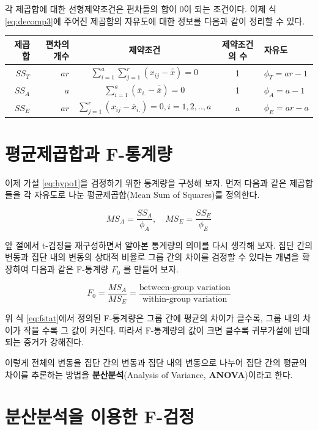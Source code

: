 \documentclass[
]{book}
\begin{document}
각 제곱합에 대한 선형제약조건은 편차들의 합이 0이 되는 조건이다. 이제 식 \eqref{eq:decomp3}에 주어진 제곱합의 자유도에 대한 정보를 다음과 같이 정리할 수 있다.

\begin{longtable}[]{@{}rrccl@{}}
\toprule
제곱합 & 편차의 개수 & 제약조건 & 제약조건의 수 & 자유도\tabularnewline
\midrule
\endhead
\(SS_T\) & \(ar\) & \(\sum_{i=1}^a \sum_{j=1}^r (x_{ij} - \bar{\bar {x}})=0\) & 1 & \(\phi_T= ar-1\)\tabularnewline
\(SS_A\) & \(a\) & \(\sum_{i=1}^a (\bar {x}_{i.} - \bar{\bar {x}} ) =0\) & 1 & \(\phi_A=a-1\)\tabularnewline
\(SS_E\) & \(ar\) & \(\sum_{j=1}^r ( x_{ij} - \bar {x}_{i.} ) =0, i=1,2,..,a\) & a & \(\phi_E=ar-a\)\tabularnewline
\bottomrule
\end{longtable}

\hypertarget{uxd3c9uxade0uxc81cuxacf1uxd569uxacfc-f-uxd1b5uxacc4uxb7c9}{%
\section{평균제곱합과 F-통계량}\label{uxd3c9uxade0uxc81cuxacf1uxd569uxacfc-f-uxd1b5uxacc4uxb7c9}}

이제 가설 \eqref{eq:hypo1}을 검정하기 위한 통계량을 구성해 보자. 먼저 다음과 같은 제곱합들을 각 자유도로 나눈 평균제곱합(Mean Sum of Squares)를 정의한다.

\begin{equation}
MS_A = \frac{SS_A}{\phi_A}, \quad MS_E =\frac{SS_E}{\phi_E} 
\label{eq:mse}
\end{equation}

앞 절에서 t-검정을 재구성하면서 알아본 통계량의 의미를 다시 생각해 보자. 집단 간의 변동과 집단 내의 변동의 상대적 비율로 그룹 간의 차이를 검정할 수 있다는 개념을 확장하여 다음과 같은 F-통계량 \(F_0\) 를 만들어 보자.

\begin{equation}
F_0 =  \frac{MS_A}{MS_E} = \frac{\text{between-group variation}} {\text{within-group variation}} 
\label{eq:fstat}
\end{equation}

위 식 \eqref{eq:fstat}에서 정의된 F-통계량은 그룹 간에 평균의 차이가 클수록, 그룹 내의 차이가 작을 수록 그 값이 커진다.
따라서 F-통계량의 값이 크면 클수록 귀무가설에 반대되는 증거가 강해진다.

이렇게 전체의 변동을 집단 간의 변동과 집단 내의 변동으로 나누어 집단 간의 평균의 차이를 추론하는 방법을 \textbf{분산분석}(Analysis of Variance, \textbf{ANOVA})이라고 한다.

\hypertarget{uxbd84uxc0b0uxbd84uxc11duxc744-uxc774uxc6a9uxd55c-f-uxac80uxc815}{%
\section{분산분석을 이용한 F-검정}\label{uxbd84uxc0b0uxbd84uxc11duxc744-uxc774uxc6a9uxd55c-f-uxac80uxc815}}
\end{document}
